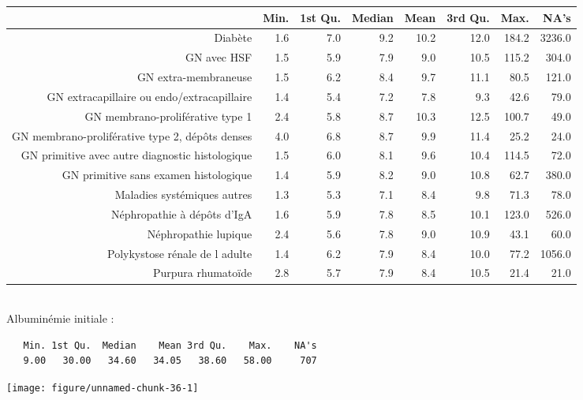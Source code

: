 \documentclass[11pt,a4paper]{article}\usepackage[]{graphicx}\usepackage[]{color}
\makeatletter
\def\maxwidth{ %
  \ifdim\Gin@nat@width>\linewidth
    \linewidth
  \else
    \Gin@nat@width
  \fi
}
\newenvironment{kframe}{%
 \def\at@end@of@kframe{}%
 \ifinner\ifhmode%
  \def\at@end@of@kframe{\end{minipage}}%
  \begin{minipage}{\columnwidth}%
 \fi\fi%
 \def\FrameCommand##1{\hskip\@totalleftmargin \hskip-\fboxsep
 \colorbox{shadecolor}{##1}\hskip-\fboxsep
     \hskip-\linewidth \hskip-\@totalleftmargin \hskip\columnwidth}%
 \MakeFramed {\advance\hsize-\width
   \@totalleftmargin\z@ \linewidth\hsize
   \@setminipage}}%
 {\par\unskip\endMakeFramed%
 \at@end@of@kframe}
\newenvironment{knitrout}{}{} %
\makeatother
\begin{document}
\begin{table}[ht]
\centering
\begingroup\small
\begin{tabular}{rrrrrrrr}
  \hline
 & Min. & 1st Qu. & Median & Mean & 3rd Qu. & Max. & NA's \\ 
  \hline
Diabète & 1.6 & 7.0 & 9.2 & 10.2 & 12.0 & 184.2 & 3236.0 \\ 
  GN avec HSF & 1.5 & 5.9 & 7.9 & 9.0 & 10.5 & 115.2 & 304.0 \\ 
  GN extra-membraneuse & 1.5 & 6.2 & 8.4 & 9.7 & 11.1 & 80.5 & 121.0 \\ 
  GN extracapillaire ou endo/extracapillaire & 1.4 & 5.4 & 7.2 & 7.8 & 9.3 & 42.6 & 79.0 \\ 
  GN membrano-proliférative type 1 & 2.4 & 5.8 & 8.7 & 10.3 & 12.5 & 100.7 & 49.0 \\ 
  GN membrano-proliférative type 2, dépôts denses & 4.0 & 6.8 & 8.7 & 9.9 & 11.4 & 25.2 & 24.0 \\ 
  GN primitive avec autre diagnostic histologique & 1.5 & 6.0 & 8.1 & 9.6 & 10.4 & 114.5 & 72.0 \\ 
  GN primitive sans examen histologique & 1.4 & 5.9 & 8.2 & 9.0 & 10.8 & 62.7 & 380.0 \\ 
  Maladies systémiques autres & 1.3 & 5.3 & 7.1 & 8.4 & 9.8 & 71.3 & 78.0 \\ 
  Néphropathie à dépôts d'IgA & 1.6 & 5.9 & 7.8 & 8.5 & 10.1 & 123.0 & 526.0 \\ 
  Néphropathie lupique & 2.4 & 5.6 & 7.8 & 9.0 & 10.9 & 43.1 & 60.0 \\ 
  Polykystose rénale de l adulte & 1.4 & 6.2 & 7.9 & 8.4 & 10.0 & 77.2 & 1056.0 \\ 
  Purpura rhumatoïde & 2.8 & 5.7 & 7.9 & 8.4 & 10.5 & 21.4 & 21.0 \\ 
   \hline
\end{tabular}
\endgroup
\end{table}


~\\

Albuminémie initiale :


\begin{knitrout}
\color{fgcolor}\begin{kframe}
\begin{verbatim}
   Min. 1st Qu.  Median    Mean 3rd Qu.    Max.    NA's 
   9.00   30.00   34.60   34.05   38.60   58.00     707 
\end{verbatim}
\end{kframe}
\texttt{[image: figure/unnamed-chunk-36-1]} 

\end{knitrout}
\end{document}
